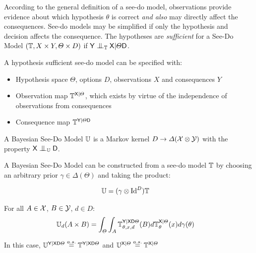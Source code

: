 \begin{definition}
According to the general definition of a see-do model, observations provide evidence about which hypothesis $\theta$ is correct \emph{and also} may directly affect the consequences. See-do models may be simplified if only the hypothesis and decision affects the consequence. The hypotheses are \emph{sufficient} for a See-Do Model $(\mathbb{T},X\times Y, \Theta\times D)$ if $\RV{Y}\CI_{\kernel{T}} \RV{X}|\Theta\RV{D}$.

A hypothesis sufficient see-do model can be specified with:

\begin{itemize}
    \item Hypothesis space $\Theta$, options $D$, observations $X$ and consequences $Y$
    \item Observation map $\mathbb{T}^{\mathsf{X}|\Theta}$, which exists by virtue of the independence of observations from consequences
    \item Consequence map $\mathbb{T}^{\mathsf{Y}|\Theta\mathsf{D}}$
\end{itemize}
\end{definition}

\begin{definition}
A Bayesian See-Do Model $\mathbb{U}$ is a Markov kernel $D\to \Delta(\mathcal{X}\otimes\mathcal{Y})$ with the property $\RV{X}\CI_{\kernel{U}}\RV{D}$.

A Bayesian See-Do Model can be constructed from a see-do model $\mathbb{T}$ by choosing an arbitrary prior $\gamma\in \Delta(\Theta)$ and taking the product:

\begin{align}
    \mathbb{U} &= (\gamma\otimes \mathrm{Id}^D)\mathbb{T}
\end{align}

For all $A\in \mathcal{X}$, $B\in\mathcal{Y}$, $d\in D$:
\begin{align}
    \mathbb{U}_d(A\times B) &= \int_\Theta \int_A \mathbb{T}_{\theta,x,d}^{\mathsf{Y}|\mathsf{X}\mathsf{D}\Theta} (B) d\mathbb{T}_{\theta}^{\mathsf{X}|\Theta}(x) d\gamma(\theta)
\end{align}

In this case, $\mathbb{U}^{\mathsf{Y}|\mathsf{X}\mathsf{D}\Theta}\overset{a.s.}{=}\mathbb{T}^{\mathsf{Y}|\mathsf{X}\mathsf{D}\Theta}$ and $\mathbb{U}^{\mathsf{X}|\Theta}\overset{a.s.}{=}\mathbb{T}^{\mathsf{X}|\Theta}$


\end{definition}

